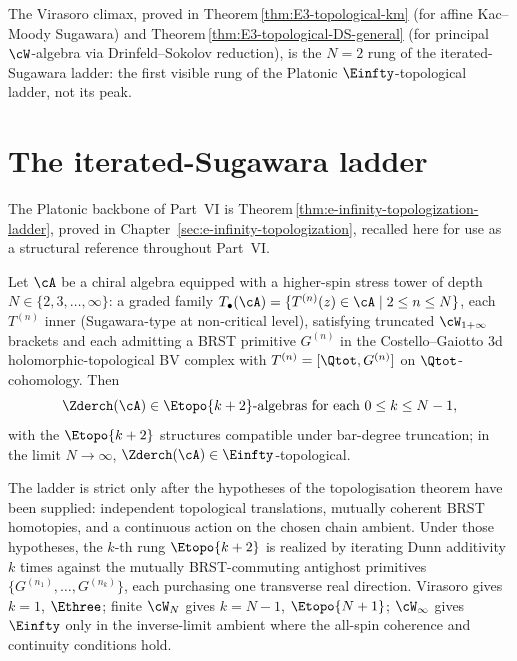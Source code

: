 The Virasoro climax, proved in
Theorem\,\ref{thm:E3-topological-km} (for affine Kac--Moody Sugawara) and
Theorem\,\ref{thm:E3-topological-DS-general} (for principal $\cW$-algebra
via Drinfeld--Sokolov reduction), is the $N=2$ rung of the
iterated-Sugawara ladder: the first visible rung of the Platonic
$\Einfty$-topological ladder, not its peak.

\section{The iterated-Sugawara ladder}
\label{sec:part-vi-ladder-preview}

The Platonic backbone of Part~VI is
Theorem\,\ref{thm:e-infinity-topologization-ladder}, proved in
Chapter~\ref{sec:e-infinity-topologization}, recalled here for use
as a structural reference throughout Part~VI.

\begin{theoremref}
\label{thm:part-vi-ladder-recall}
Let $\cA$ be a chiral algebra equipped with a higher-spin stress tower
of depth $N \in \{2, 3, \ldots, \infty\}$: a graded family
$T_\bullet(\cA) = \{T^{(n)}(z) \in \cA \mid 2 \le n \le N\}$, each
$T^{(n)}$ inner (Sugawara-type at non-critical level), satisfying
truncated $\cW_{1+\infty}$ brackets and each admitting a BRST primitive
$G^{(n)}$ in the Costello--Gaiotto 3d holomorphic-topological BV complex
with $T^{(n)} = [\Qtot, G^{(n)}]$ on $\Qtot$-cohomology. Then
\begin{equation}
 \Zderch(\cA) \in \Etopo{k+2}\text{-algebras for each } 0 \le k \le N-1,
 \label{eq:part-vi-ladder-recall}
\end{equation}
with the $\Etopo{k+2}$ structures compatible under bar-degree truncation;
in the limit $N \to \infty$, $\Zderch(\cA) \in \Einfty$-topological.
\end{theoremref}

The ladder is strict only after the hypotheses of the topologisation
theorem have been supplied: independent topological translations,
mutually coherent BRST homotopies, and a continuous action on the
chosen chain ambient. Under those hypotheses, the $k$-th rung
$\Etopo{k+2}$ is realized by iterating Dunn additivity $k$ times
against the mutually BRST-commuting antighost primitives
$\{G^{(n_1)}, \ldots, G^{(n_k)}\}$, each purchasing one transverse real
direction. Virasoro gives $k=1$, $\Ethree$; finite $\cW_N$ gives
$k=N-1$, $\Etopo{N+1}$; $\cW_\infty$ gives $\Einfty$ only in the
inverse-limit ambient where the all-spin coherence and continuity
conditions hold.

